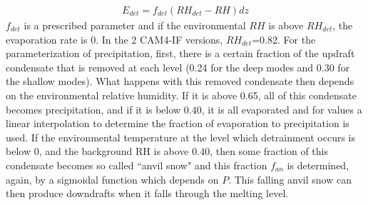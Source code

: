 \documentclass[letterpaper,12pt,titlepage,oneside,final]{book}
\begin{document}
\begin{align}
E_{det}=f_{det}(RH_{det}-RH)dz
\end{align}
$f_{det}$ is a prescribed parameter and if the environmental $RH$ is above $RH_{det}$, the evaporation rate is 0. In the 2 CAM4-IF versions, $RH_{det}$=0.82. For the parameterization of precipitation, first, there is a certain fraction of the updraft condensate that is removed at each level (0.24 for the deep modes and 0.30 for the shallow modes). What happens with this removed condensate then depends on the environmental relative humidity. If it is above 0.65, all of this condensate becomes precipitation, and if it is below 0.40, it is all evaporated and for values a linear interpolation to determine the fraction of evaporation to precipitation is used. If the environmental temperature at the level which detrainment occurs is below 0, and the background RH is above 0.40, then some fraction of this condensate becomes so called ``anvil snow" and this fraction $f_{an}$ is determined, again, by a sigmoidal function which depends on $P$. This falling anvil snow can then produce downdrafts when it falls through the melting level.
\end{document}
